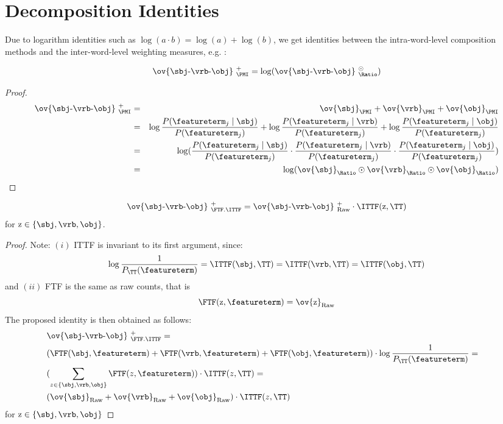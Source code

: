\section{Decomposition Identities}
{Due to  logarithm identities such as  $\log(a\cdot b) = \log(a) + \log(b)$, we get identities  between the intra-word-level composition methods and the inter-word-level weighting measures, e.g. : 

\begin{proposition}
\[
\ov{\sbj\text{-}\vrb\text{-}\obj}\ _{\PMI}^{+} = \log(\ov{\sbj\text{-}\vrb\text{-}\obj}\ _{\Ratio}^{\odot})
\]
\end{proposition}
\begin{proof}
\begin{eqnarray*}
\ov{\sbj\text{-}\vrb\text{-}\obj}\ _{\PMI}^{+} &=& \ov{\sbj}_{\PMI} + \ov{\vrb}_{\PMI} + \ov{\obj}_{\PMI} \\
&=&  \log\frac{P(\featureterm_j \mid \sbj)}{P(\featureterm_j)} + \log\frac{P(\featureterm_j \mid \vrb)}{P(\featureterm_j)} + \log\frac{P(\featureterm_j \mid \obj)}{P(\featureterm_j)}\\
&=& \log(\frac{P(\featureterm_j \mid \sbj)}{P(\featureterm_j)} \cdot \frac{P(\featureterm_j \mid \vrb)}{P(\featureterm_j)} \cdot \frac{P(\featureterm_j \mid \obj)}{P(\featureterm_j)})\\
&=& \log (\ov{\sbj}_{\Ratio} \odot \ov{\vrb}_{\Ratio} \odot \ov{\obj}_{\Ratio})
\end{eqnarray*}
\end{proof}

\begin{proposition}
\label{prop:TF-ITTF}
\[
\ov{\sbj\text{-}\vrb\text{-}\obj}\ _{\FTF.\ITTF}^{+} = \ov{\sbj\text{-}\vrb\text{-}\obj}\ _{\textmd{Raw}}^{+} \cdot  \ITTF (\textmd{z}, \TT)
\]
for $\textmd{z} \in \{\sbj, \vrb, \obj\}$. 
\end{proposition}
\begin{proof}
 Note:  $(i)$ ITTF is invariant to  its first argument, since:
 \[
 \log\frac{1}{P_{\TT}(\featureterm)} =  \ITTF(\sbj, \TT)  = \ITTF(\vrb, \TT) = \ITTF (\obj, \TT) 
\]
and $(ii)$ FTF is the same as raw counts, that is
 \[
 \FTF(\textmd{z},\featureterm) = \ov{\textmd{z}}_{\textmd{Raw}}
 \]
 The proposed identity is then obtained as follows:
\begin{align*}
&\ov{\sbj\text{-}\vrb\text{-}\obj}\ _{\FTF.\ITTF}^{+} =& \\
&( \FTF(\sbj, \featureterm) + 
\FTF(\vrb, \featureterm)  + 
\FTF(\obj, \featureterm) ) \cdot  \log\frac{1}{P_{\TT}(\featureterm)}
=& \\
&(\sum_{z \in \{\sbj, \vrb, \obj\}} \FTF(z, \featureterm)) \cdot \ITTF(z, \TT) =& \\
&(\ov{\sbj}_{\textmd{Raw}} + \ov{\vrb}_{\textmd{Raw}} + \ov{\obj}_{\textmd{Raw}})  \cdot  
\ITTF(z, \TT) &
\end{align*}
for $\textmd{z} \in \{\sbj, \vrb, \obj\}$
\end{proof}

}
